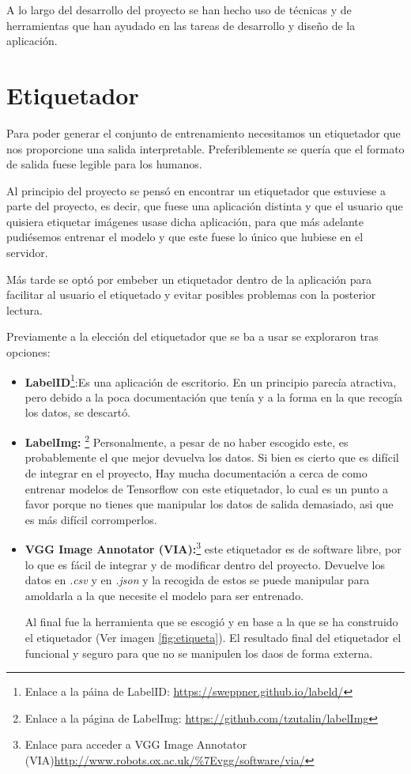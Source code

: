 \label{c.4}

A lo largo del desarrollo del proyecto se han hecho uso de técnicas y de herramientas que han ayudado en las tareas de desarrollo y diseño de la aplicación.

\section{Etiquetador}
Para poder generar el conjunto de entrenamiento necesitamos un etiquetador que nos proporcione una salida interpretable. Preferiblemente se quería que el formato de salida fuese legible para los humanos. 

Al principio del proyecto se pensó en encontrar un etiquetador que estuviese a parte del proyecto, es decir, que fuese una aplicación distinta y que el usuario que quisiera etiquetar imágenes usase dicha aplicación, para que más adelante pudiésemos entrenar el modelo y que este fuese lo único que hubiese en el servidor.

Más tarde se optó por embeber un etiquetador dentro de la aplicación para facilitar al usuario el etiquetado y evitar posibles problemas con la posterior lectura. 

Previamente a la elección del etiquetador que se ba a usar se exploraron tras opciones:

\begin{itemize}
	\item \textbf{LabelID}\footnote{Enlace a la páina de LabelID: \url{https://sweppner.github.io/labeld/}}:Es una aplicación de escritorio. En un principio parecía atractiva, pero debido a la poca documentación que tenía y a la forma en la que recogía los datos, se descartó.

	\item \textbf{LabelImg:} \footnote{Enlace a la página de LabelImg:  \url{https://github.com/tzutalin/labelImg}} Personalmente, a pesar de no haber escogido este, es probablemente el que mejor devuelva los datos. Si bien es cierto que es difícil de integrar en el proyecto, Hay mucha documentación a cerca de como entrenar modelos de Tensorflow con este etiquetador, lo cual es un punto a favor porque no tienes que manipular los datos de salida demasiado, asi que es más difícil corromperlos.
	
	\item \textbf{VGG Image Annotator (VIA):}\footnote{Enlace para acceder a VGG Image Annotator (VIA)\url{http://www.robots.ox.ac.uk/\%7Evgg/software/via/}} este etiquetador es de software libre, por lo que es fácil de integrar y de modificar dentro del proyecto. Devuelve los datos en \textit{.csv} y en \textit{.json} y la recogida de estos se puede manipular para amoldarla a la que necesite el modelo para ser entrenado.
	
	Al final fue la herramienta que se escogió y en base a la que se ha construido el etiquetador (Ver imagen \ref{fig:etiqueta}). El resultado final del etiquetador el funcional y seguro para que no se manipulen los daos de forma externa.
	
\end{itemize}

